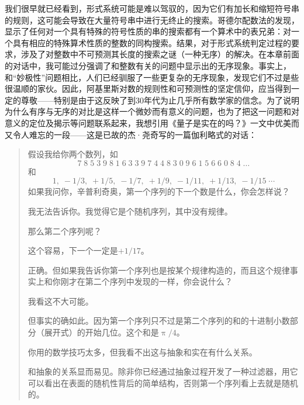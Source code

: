 我们很早就已经看到，形式系统可能是难以驾驭的，因为它们有加长和缩短符号串的规则，这可能会导致在大量符号串中进行无终止的搜索。哥德尔配数法的发现，显示了任何对一个具有特殊的符号性质的串的搜索都有一个算术中的表兄弟：对一个具有相应的特殊算术性质的整数的同构搜索。结果，对于形式系统判定过程的要求，涉及了对整数中不可预测其长度的搜索之谜（一种无序）的解决。在本章前面的对话中，我可能过分强调了和整数有关的问题中显示出的无序现象。事实上，和“妙极性”问题相比，人们已经驯服了一些更复杂的无序现象，发现它们不过是些很温顺的家伙。因此，阿基里斯对数的规则性和可预测性的坚定信仰，应当得到一定的尊敬——特别是由于这反映了到30年代为止几乎所有数学家的信念。为了说明为什么有序与无序的对比是这样一个微妙而有意义的问题，也为了把这一问题和对意义的定位及揭示等问题联系起来，我想引用《量子是实在的吗？》一文中优美而又令人难忘的一段——这是已故的杰·尧奇写的一篇伽利略式的对话：
\begin{quote}
\begin{description}[wide,labelsep=\ccwd,format=\sffamily\itemcolon]
\item[萨尔维亚蒂]假设我给你两个数列，如
\[
7\;8\;5\;3\;9\;8\;1\;6\;3\;3\;9\;7\;4\;4\;8\;3\;0\;9\;
6\;1\;5\;6\;6\;0\; 8\;4\;\dotsc
\]
和
\[
1,\;-1/3,\;+1/5,\;-1/7,\;+1/9,\;-1/11,\;+1/13,\;-1/15\;\cdots
\]
如果我问你，辛普利奇奥，第一个序列的下一个数是什么，你会怎样说？

\item[辛普利奇奥]我无法告诉你。我觉得它是个随机序列，其中没有规律。

\item[萨尔维亚蒂]那么第二个序列呢？

\item[辛普利奇奥]这个容易，下一个一定是$+1/17$。

\item[萨尔维亚蒂]正确。但如果我告诉你第一个序列也是按某个规律构造的，而且这个规律事实上和你刚才在第二个序列中发现的一样，你会说什么？

\item[辛普利奇奥]我看这不大可能。

\item[萨尔维亚蒂]但事实的确如此。因为第一个序列只不过是第二个序列的和的十进制小数部分（展开式）的开始几位。这个和是$\uppi/4$。

\item[辛普利奇奥]你用的数学技巧太多，但我看不出这与抽象和实在有什么关系。

\item[萨尔维亚蒂]和抽象的关系显而易见。除非你已经通过抽象过程开发了一种过滤器，用它可以看出在表面的随机性背后的简单结构，否则第一个序列看上去就是随机的。


\end{description}
\end{quote}
